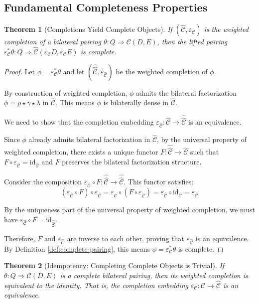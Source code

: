 \documentclass[11pt]{article}
\theoremstyle{plain}
\newtheorem{theorem}{Theorem}[section]
\theoremstyle{definition}
\theoremstyle{remark}
\newcommand{\C}{\mathcal{C}}
\newcommand{\id}{\mathrm{id}}
\newcommand{\wh}[1]{\widehat{#1}}
\begin{document}
\subsection{Fundamental Completeness Properties}

\begin{theorem}[Completions Yield Complete Objects]\label{thm:completions-are-complete}
If $(\wh{\C}, \varepsilon_\C)$ is the weighted completion of a bilateral pairing $\theta : Q \Rightarrow \C(D, E)$, then the lifted pairing $\varepsilon_\C^* \theta : Q \Rightarrow \wh{\C}(\varepsilon_\C D, \varepsilon_\C E)$ is complete.
\end{theorem}

\begin{proof}
Let $\phi = \varepsilon_\C^* \theta$ and let $(\wh{\wh{\C}}, \varepsilon_{\wh{\C}})$ be the weighted completion of $\phi$.

By construction of weighted completion, $\phi$ admits the bilateral factorization $\phi = \rho \star \gamma \star \lambda$ in $\wh{\C}$. This means $\phi$ is bilaterally dense in $\wh{\C}$.

We need to show that the completion embedding $\varepsilon_{\wh{\C}} : \wh{\C} \to \wh{\wh{\C}}$ is an equivalence.

Since $\phi$ already admits bilateral factorization in $\wh{\C}$, by the universal property of weighted completion, there exists a unique functor $F : \wh{\wh{\C}} \to \wh{\C}$ such that $F \circ \varepsilon_{\wh{\C}} = \id_{\wh{\C}}$ and $F$ preserves the bilateral factorization structure.

Consider the composition $\varepsilon_{\wh{\C}} \circ F : \wh{\wh{\C}} \to \wh{\wh{\C}}$. This functor satisfies:
$$(\varepsilon_{\wh{\C}} \circ F) \circ \varepsilon_{\wh{\C}} = \varepsilon_{\wh{\C}} \circ (F \circ \varepsilon_{\wh{\C}}) = \varepsilon_{\wh{\C}} \circ \id_{\wh{\C}} = \varepsilon_{\wh{\C}}$$

By the uniqueness part of the universal property of weighted completion, we must have $\varepsilon_{\wh{\C}} \circ F = \id_{\wh{\wh{\C}}}$.

Therefore, $F$ and $\varepsilon_{\wh{\C}}$ are inverse to each other, proving that $\varepsilon_{\wh{\C}}$ is an equivalence. By Definition \ref{def:complete-pairing}, this means $\phi = \varepsilon_\C^* \theta$ is complete.
\end{proof}

\begin{theorem}[Idempotency: Completing Complete Objects is Trivial]\label{thm:idempotency}
If $\theta : Q \Rightarrow \C(D, E)$ is a complete bilateral pairing, then its weighted completion is equivalent to the identity. That is, the completion embedding $\varepsilon_\C : \C \to \wh{\C}$ is an equivalence.
\end{theorem}
\end{document}
